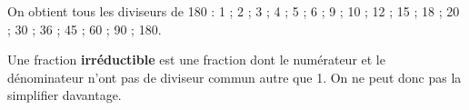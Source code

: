 \begin{center} 
\end{center}

   On obtient tous les diviseurs de 180 : 1 ; 2 ; 3 ; 4 ; 5 ; 6 ; 9 ; 10 ; 12 ; 15 ; 18 ; 20 ; 30 ; 36 ; 45 ; 60 ; 90 ; 180.
   
\smallskip


\begin{definition}[Irréductibilité]
   Une fraction {\bf irréductible} est une fraction dont le numérateur et le dénominateur n'ont pas de diviseur commun autre que 1. On ne peut donc pas la simplifier davantage.
\end{definition}

